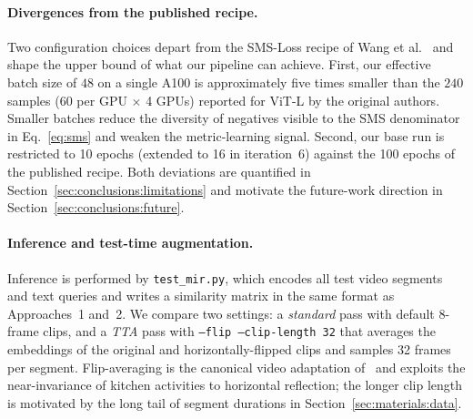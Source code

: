 \paragraph{Divergences from the published recipe.}
Two configuration choices depart from the SMS-Loss recipe of Wang et al.~\cite{wang2024symmetricmultisimilaritylossepickitchens100} and shape the upper bound of what our pipeline can achieve. First, our effective batch size of $48$ on a single A100 is approximately five times smaller than the $240$ samples (60 per GPU $\times$ 4 GPUs) reported for ViT-L by the original authors. Smaller batches reduce the diversity of negatives visible to the SMS denominator in Eq.~\eqref{eq:sms} and weaken the metric-learning signal. Second, our base run is restricted to 10 epochs (extended to 16 in iteration~6) against the 100 epochs of the published recipe. Both deviations are quantified in Section~\ref{sec:conclusions:limitations} and motivate the future-work direction in Section~\ref{sec:conclusions:future}.

\paragraph{Inference and test-time augmentation.}
Inference is performed by \texttt{test\_mir.py}, which encodes all test video segments and text queries and writes a similarity matrix in the same format as Approaches~1 and~2. We compare two settings: a \emph{standard} pass with default 8-frame clips, and a \emph{TTA} pass with \texttt{--flip --clip-length 32} that averages the embeddings of the original and horizontally-flipped clips and samples 32 frames per segment. Flip-averaging is the canonical video adaptation of~\cite{krizhevsky2012alexnet} and exploits the near-invariance of kitchen activities to horizontal reflection; the longer clip length is motivated by the long tail of segment durations in Section~\ref{sec:materials:data}.
